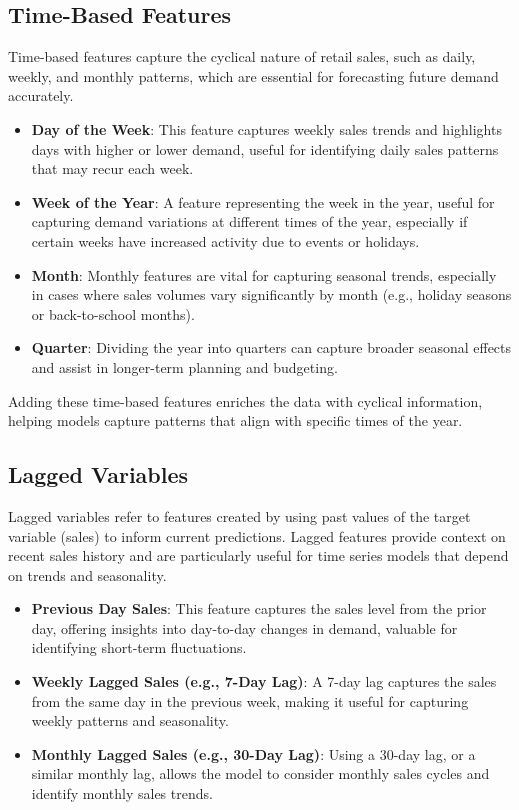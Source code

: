 \subsection{Time-Based Features}

Time-based features capture the cyclical nature of retail sales, such as daily, weekly, and monthly patterns, which are essential for forecasting future demand accurately.

\begin{itemize}
    \item \textbf{Day of the Week}: This feature captures weekly sales trends and highlights days with higher or lower demand, useful for identifying daily sales patterns that may recur each week.
    \item \textbf{Week of the Year}: A feature representing the week in the year, useful for capturing demand variations at different times of the year, especially if certain weeks have increased activity due to events or holidays.
    \item \textbf{Month}: Monthly features are vital for capturing seasonal trends, especially in cases where sales volumes vary significantly by month (e.g., holiday seasons or back-to-school months).
    \item \textbf{Quarter}: Dividing the year into quarters can capture broader seasonal effects and assist in longer-term planning and budgeting.
\end{itemize}

Adding these time-based features enriches the data with cyclical information, helping models capture patterns that align with specific times of the year.

\subsection{Lagged Variables}

Lagged variables refer to features created by using past values of the target variable (sales) to inform current predictions. Lagged features provide context on recent sales history and are particularly useful for time series models that depend on trends and seasonality.

\begin{itemize}
    \item \textbf{Previous Day Sales}: This feature captures the sales level from the prior day, offering insights into day-to-day changes in demand, valuable for identifying short-term fluctuations.
    \item \textbf{Weekly Lagged Sales (e.g., 7-Day Lag)}: A 7-day lag captures the sales from the same day in the previous week, making it useful for capturing weekly patterns and seasonality.
    \item \textbf{Monthly Lagged Sales (e.g., 30-Day Lag)}: Using a 30-day lag, or a similar monthly lag, allows the model to consider monthly sales cycles and identify monthly sales trends.
\end{itemize}

